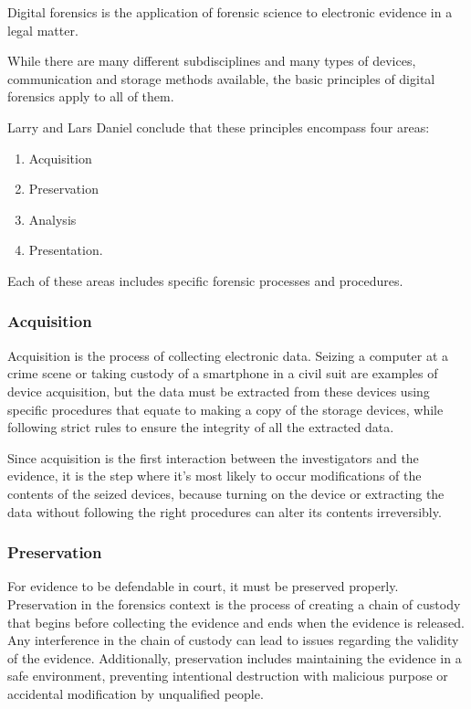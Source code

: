 Digital forensics is the application of forensic science to electronic evidence in a
legal matter.

While there are many different subdisciplines and many types of devices, communication
and storage methods available, the basic principles of digital forensics
apply to all of them.

Larry and Lars Daniel \cite{daniels} conclude that these principles encompass four areas:

\begin{enumerate}
\item Acquisition
\item Preservation
\item Analysis
\item Presentation.
\end{enumerate}

Each of these areas includes specific forensic processes and procedures.

\subsubsection*{Acquisition}

Acquisition is the process of collecting electronic data. Seizing a computer at a crime scene or
taking custody of a smartphone in a civil suit are examples of device acquisition, but the data 
must be extracted from these devices using specific procedures that equate to making a copy of
the storage devices, while following strict rules to ensure the integrity of all the extracted data.

Since acquisition is the first interaction between the investigators and the evidence,
it is the step where it's most likely to occur modifications of the contents of the seized devices,
because turning on the device or extracting the data without following the right procedures can alter
its contents irreversibly.

\subsubsection*{Preservation}

For evidence to be defendable in court, it must be preserved properly.
Preservation in the forensics context is the process of creating a chain of custody \cite{custody}
that begins before collecting the evidence and ends when the evidence is released.
Any interference in the chain of custody can lead to issues regarding the validity of the evidence.
Additionally, preservation includes maintaining the evidence in a safe environment, preventing
intentional destruction with malicious purpose or accidental modification by unqualified people.

